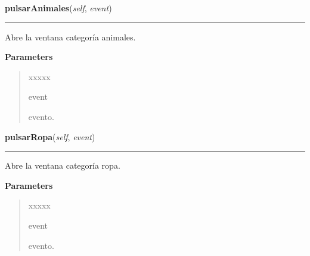     \vspace{0.5ex}

\hspace{.8\funcindent}\begin{boxedminipage}{\funcwidth}

    \raggedright \textbf{pulsarAnimales}(\textit{self}, \textit{event})

    \vspace{-1.5ex}

    \rule{\textwidth}{0.5\fboxrule}
\setlength{\parskip}{2ex}
    Abre la ventana categoría animales.

\setlength{\parskip}{1ex}
      \textbf{Parameters}
      \vspace{-1ex}

      \begin{quote}
        \begin{Ventry}{xxxxx}

          \item[event]

          evento.

        \end{Ventry}

      \end{quote}

    \end{boxedminipage}

    \label{informacion:Informacion:pulsarRopa}

    \vspace{0.5ex}

\hspace{.8\funcindent}\begin{boxedminipage}{\funcwidth}

    \raggedright \textbf{pulsarRopa}(\textit{self}, \textit{event})

    \vspace{-1.5ex}

    \rule{\textwidth}{0.5\fboxrule}
\setlength{\parskip}{2ex}
    Abre la ventana categoría ropa.

\setlength{\parskip}{1ex}
      \textbf{Parameters}
      \vspace{-1ex}

      \begin{quote}
        \begin{Ventry}{xxxxx}

          \item[event]

          evento.

        \end{Ventry}

      \end{quote}

    \end{boxedminipage}

